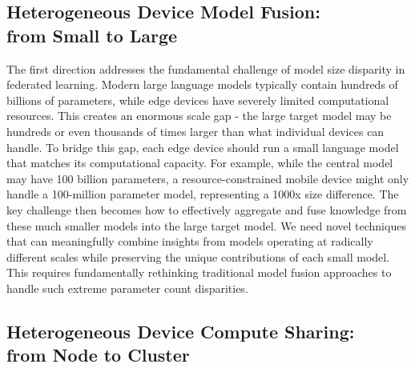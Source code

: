 \subsection{Heterogeneous Device Model Fusion: \\from Small to Large}\label{subsec:model_fusion}

The first direction addresses the fundamental challenge of model size disparity in federated learning. Modern large language models typically contain hundreds of billions of parameters, while edge devices have severely limited computational resources. This creates an enormous scale gap - the large target model may be hundreds or even thousands of times larger than what individual devices can handle. To bridge this gap, each edge device should run a small language model that matches its computational capacity. For example, while the central model may have 100 billion parameters, a resource-constrained mobile device might only handle a 100-million parameter model, representing a 1000x size difference. 
The key challenge then becomes how to effectively aggregate and fuse knowledge from these much smaller models into the large target model. 
We need novel techniques that can meaningfully combine insights from models operating at radically different scales while preserving the unique contributions of each small model. This requires fundamentally rethinking traditional model fusion approaches \citep{velasevic2023effects,azizan2019distributed} to handle such extreme parameter count disparities.

\subsection{Heterogeneous Device Compute Sharing:\\ from Node to Cluster}\label{subsec:compute_sharing}

